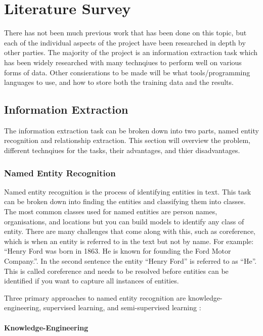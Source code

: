 \chapter{Literature Survey}

There has not been much previous work that has been done on this topic, but each of the individual aspects of the project have been researched in depth by other parties. The majority of the project is an information extraction task which has been widely researched with many technqiues to perform well on various forms of data. Other consierations to be made will be what tools/programming languages to use, and how to store both the training data and the results.

\section{Information Extraction}

The information extraction task can be broken down into two parts, named entity recognition and relationship extraction. This section will overview the problem, different technqiues for the tasks, their advantages, and thier disadvantages.

\subsection{Named Entity Recognition}

Named entity recognition is the process of identifying entities in text. This task can be broken down into finding the entities and classifying them into classes. The most common classes used for named entities are person names, organisations, and locations but you can build models to identify any class of entity. There are many challenges that come along with this, such as coreference, which is when an entity is referred to in the text but not by name. For example: “Henry Ford was born in 1863. He is known for founding the Ford Motor Company.”. In the second sentence the entity “Henry Ford” is referred to as “He”. This is called coreference and needs to be resolved before entities can be identified if you want to capture all instances of entities.

Three primary approaches to named entity recognition are knowledge-engineering, supervised learning, and semi-supervised learning \citep{text_processing_lecture_5}:

\subsubsection{Knowledge-Engineering}

